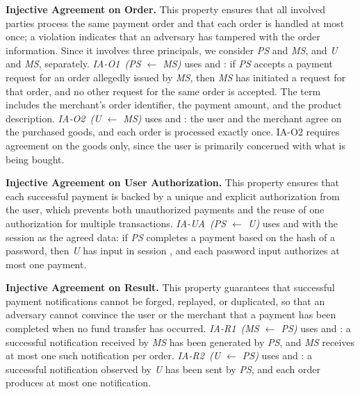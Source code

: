 \textbf{Injective Agreement on Order.}
This property ensures that all involved parties process the same payment order and that each order is handled at most once; a violation indicates that an adversary has tampered with the order information.
Since it involves three principals, we consider \emph{PS} and \emph{MS}, and \emph{U} and \emph{MS}, separately.
\emph{IA-O1~(\emph{PS} $\leftarrow$ \emph{MS})} uses  and : if \emph{PS} accepts a payment request for an order allegedly issued by \emph{MS}, then \emph{MS} has initiated a request for that order, and no other request for the same order is accepted.
The term  includes the merchant's order identifier, the payment amount, and the product description.
\emph{IA-O2~(\emph{U} $\leftarrow$ \emph{MS})} uses  and : the user and the merchant agree on the purchased goods, and each order is processed exactly once.
IA-O2 requires agreement on the goods only, since the user is primarily concerned with what is being bought.

\textbf{Injective Agreement on User Authorization.}
This property ensures that each successful payment is backed by a unique and explicit authorization from the user, which prevents both unauthorized payments and the reuse of one authorization for multiple transactions.
\emph{IA-UA~(\emph{PS} $\leftarrow$ \emph{U})} uses  and  with the session  as the agreed data: if \emph{PS} completes a payment based on the hash  of a password, then \emph{U} has input  in session , and each password input authorizes at most one payment.

\textbf{Injective Agreement on Result.}
This property guarantees that successful payment notifications cannot be forged, replayed, or duplicated, so that an adversary cannot convince the user or the merchant that a payment has been completed when no fund transfer has occurred.
\emph{IA-R1~(\emph{MS} $\leftarrow$ \emph{PS})} uses  and : a successful notification received by \emph{MS} has been generated by \emph{PS}, and \emph{MS} receives at most one such notification per order.
\emph{IA-R2~(\emph{U} $\leftarrow$ \emph{PS})} uses  and : a successful notification observed by \emph{U} has been sent by \emph{PS}, and each order produces at most one notification.
